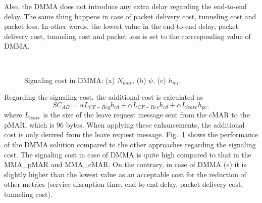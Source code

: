 Also, the DMMA does not introduce any extra delay regarding the end-to-end delay. The same thing happens in case of packet delivery cost, tunneling cost and packet loss. In other words, the lowest value in the end-to-end delay, packet delivery cost, tunneling cost and packet loss is set to the corresponding value of DMMA. 

\begin{figure}[h!]
\centering
{}
\,
\caption[Signaling cost in DMMA.]{Signaling cost in DMMA: (a) $N_{mar}$, (b) $\psi$, (c) $h_{mi}$.}
\label{fig:c10_sc_all}
\end{figure}
Regarding the signaling cost, the additional cost is calculated as\\
\begin{equation}
SC_{AD} =\alpha L_{CF-Req} h_{cd} + \alpha L_{CF-Res} h_{cd} + \alpha L_{leave} h_{pc},
\end{equation}
where $L_{leave}$ is the size of the leave request message sent from the cMAR to the pMAR, which is 96 bytes. When applying these enhancements, the additional cost is only derived from the leave request message. Fig.~\ref{fig:c10_sc_all} shows the performance of the DMMA solution compared to the other approaches regarding the signaling cost. The signaling cost in case of DMMA is quite high compared to that in the MMA\_pMAR and MMA\_cMAR. On the contrary, in case of DMMA (e) it is slightly higher than the lowest value as an acceptable cost for the reduction of other metrics (service disruption time, end-to-end delay, packet delivery cost, tunneling cost). 

